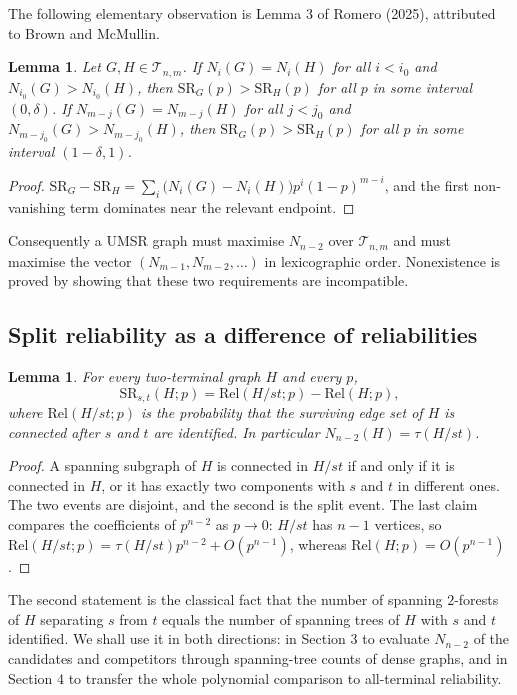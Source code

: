 \documentclass[
  11pt,
]{article}
\newtheorem{lemma}[theorem]{Lemma}
\theoremstyle{definition}
\theoremstyle{remark}
\begin{document}
The following elementary observation is Lemma 3 of Romero (2025),
attributed to Brown and McMullin.

\begin{lemma}\label{lem:ends}
Let $G,H\in\mathcal T_{n,m}$. If $N_i(G)=N_i(H)$ for all $i<i_0$ and $N_{i_0}(G)>N_{i_0}(H)$, then $\mathrm{SR}_G(p)>\mathrm{SR}_H(p)$ for all $p$ in some interval $(0,\delta)$. If $N_{m-j}(G)=N_{m-j}(H)$ for all $j<j_0$ and $N_{m-j_0}(G)>N_{m-j_0}(H)$, then $\mathrm{SR}_G(p)>\mathrm{SR}_H(p)$ for all $p$ in some interval $(1-\delta,1)$.
\end{lemma}

\begin{proof}
$\mathrm{SR}_G-\mathrm{SR}_H=\sum_i\big(N_i(G)-N_i(H)\big)p^i(1-p)^{m-i}$, and the first non-vanishing term dominates near the relevant endpoint.
\end{proof}

Consequently a UMSR graph must maximise \(N_{n-2}\) over
\(\mathcal T_{n,m}\) and must maximise the vector
\((N_{m-1},N_{m-2},\dots)\) in lexicographic order. Nonexistence is
proved by showing that these two requirements are incompatible.

\subsection{Split reliability as a difference of
reliabilities}\label{split-reliability-as-a-difference-of-reliabilities}

\begin{lemma}\label{lem:identity}
For every two-terminal graph $H$ and every $p$,
$$\mathrm{SR}_{s,t}(H;p)=\mathrm{Rel}(H/st;p)-\mathrm{Rel}(H;p),$$
where $\mathrm{Rel}(H/st;p)$ is the probability that the surviving edge set of $H$ is connected after $s$ and $t$ are identified. In particular $N_{n-2}(H)=\tau(H/st)$.
\end{lemma}

\begin{proof}
A spanning subgraph of $H$ is connected in $H/st$ if and only if it is connected in $H$, or it has exactly two components with $s$ and $t$ in different ones. The two events are disjoint, and the second is the split event. The last claim compares the coefficients of $p^{n-2}$ as $p\to0$: $H/st$ has $n-1$ vertices, so $\mathrm{Rel}(H/st;p)=\tau(H/st)p^{n-2}+O(p^{n-1})$, whereas $\mathrm{Rel}(H;p)=O(p^{n-1})$.
\end{proof}

The second statement is the classical fact that the number of spanning
\(2\)-forests of \(H\) separating \(s\) from \(t\) equals the number of
spanning trees of \(H\) with \(s\) and \(t\) identified. We shall use it
in both directions: in Section 3 to evaluate \(N_{n-2}\) of the
candidates and competitors through spanning-tree counts of dense graphs,
and in Section 4 to transfer the whole polynomial comparison to
all-terminal reliability.
\end{document}
